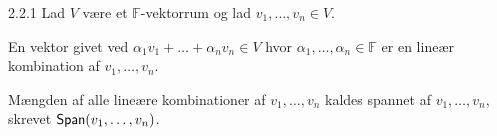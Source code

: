 \begin{definition}{2.2.1}
	Lad $V$ være et $\mathbb{F}$-vektorrum og lad $v_1,\dots,v_n \in V$. 

	En vektor givet ved $\alpha_1 v_1+\dots+\alpha_n v_n \in V$ hvor
	$\alpha_1,\dots,\alpha_n \in \mathbb{F}$ er en lineær kombination af
	$v_1,\dots,v_n$. 
	
	Mængden af alle lineære kombinationer af $v_1,\dots,v_n$ kaldes spannet af
$v_1,\dots,v_n$, skrevet $\textsf{Span}(v_1,\dots,v_n)$.
\end{definition}
